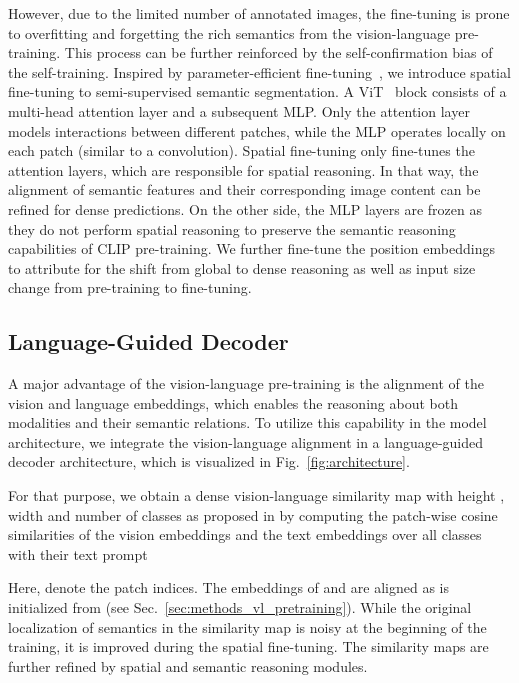 \documentclass[10pt,twocolumn,letterpaper]{article}
\begin{document}
However, due to the limited number of annotated images, the fine-tuning is prone to overfitting and forgetting the rich semantics from the vision-language pre-training. This process can be further reinforced by the self-confirmation bias of the self-training. Inspired by parameter-efficient fine-tuning~\cite{hu2021lora, jia2022visual, cho2023cat, sung2022vl}, we introduce spatial fine-tuning to semi-supervised semantic segmentation.
A ViT~\cite{dosovitskiy2020image} block consists of a multi-head attention layer and a subsequent MLP.
Only the attention layer models interactions between different patches, while the MLP operates locally on each patch (similar to a  convolution).
Spatial fine-tuning only fine-tunes the attention layers, which are responsible for spatial reasoning. In that way, the alignment of semantic features and their corresponding image content can be refined for dense predictions. On the other side, the MLP layers are frozen as they do not perform spatial reasoning to preserve the semantic reasoning capabilities of CLIP pre-training.
We further fine-tune the position embeddings to attribute for the shift from global to dense reasoning as well as input size change from pre-training to fine-tuning.


\subsection{Language-Guided Decoder}
\label{sec:methods_language_guided_decoder}

A major advantage of the vision-language pre-training is the alignment of the vision and language embeddings, which enables the reasoning about both modalities and their semantic relations. To utilize this capability in the model architecture, we integrate the vision-language alignment in a language-guided decoder architecture, which is visualized in Fig.~\ref{fig:architecture}.

For that purpose, we obtain a dense vision-language similarity map  with height , width  and number of classes  as proposed in \cite{zhou2022extract} by computing the patch-wise cosine similarities of the vision embeddings  and the text embeddings  over all classes  with their text prompt 

Here,  denote the patch indices. The embeddings of  and  are aligned as  is initialized from  (see Sec.~\ref{sec:methods_vl_pretraining}). While the original localization of semantics in the similarity map is noisy at the beginning of the training, it is improved during the spatial fine-tuning.
The similarity maps are further refined by spatial and semantic reasoning modules.
\end{document}
